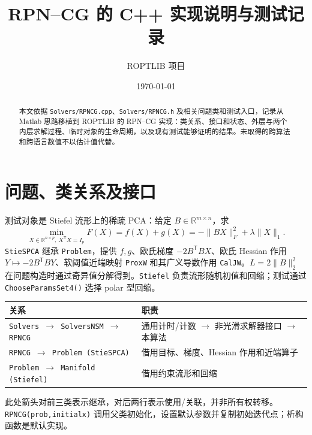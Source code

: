 \documentclass[a4paper,10pt]{article}
\title{RPN--CG 的 C++ 实现说明与测试记录}
\author{ROPTLIB 项目}
\date{\today}
\newcommand{\code}[1]{\texttt{#1}}
\begin{document}
\maketitle
\begin{abstract}
本文依据 \code{Solvers/RPNCG.cpp}、\code{Solvers/RPNCG.h} 及相关问题类和测试入口，记录从 Matlab 思路移植到 ROPTLIB 的 RPN--CG 实现：类关系、接口和状态、外层与两个内层求解过程、临时对象的生命周期，以及现有测试能够证明的结果。未取得的跨算法和跨语言数值不以估计值代替。
\end{abstract}

\section{问题、类关系及接口}
测试对象是 Stiefel 流形上的稀疏 PCA：给定 $B\in\mathbb R^{m\times n}$，求
\begin{equation}
 \min_{X\in\mathbb R^{n\times p},\ X^{\mathsf T}X=I_p}
 F(X)=f(X)+g(X)=-\|BX\|_F^2+\lambda\|X\|_1.
\end{equation}
\code{StieSPCA} 继承 \code{Problem}，提供 $f,g$、欧氏梯度 $-2B^{\mathsf T}BX$、欧氏 Hessian 作用 $Y\mapsto-2B^{\mathsf T}BY$、软阈值近端映射 \code{ProxW} 和其广义导数作用 \code{CalJW}。$L=2\|B\|_2^2$ 在问题构造时通过奇异值分解得到。\code{Stiefel} 负责流形随机初值和回缩；测试通过 \code{ChooseParamsSet4()} 选择 polar 型回缩。

\begin{center}
\begin{tabular}{@{}ll@{}}
\toprule
关系 & 职责 \\ \midrule
\code{Solvers $\to$ SolversNSM $\to$ RPNCG} & 通用计时/计数 $\to$ 非光滑求解器接口 $\to$ 本算法 \\
\code{RPNCG $\to$ Problem (StieSPCA)} & 借用目标、梯度、Hessian 作用和近端算子 \\
\code{Problem $\to$ Manifold (Stiefel)} & 借用约束流形和回缩 \\
\bottomrule
\end{tabular}
\end{center}
此处箭头对前三类表示继承，对后两行表示使用/关联，并非所有权转移。\code{RPNCG(prob,initialx)} 调用父类初始化，设置默认参数并复制初始迭代点；析构函数是默认实现。
\end{document}

